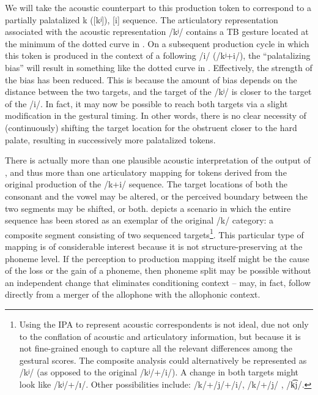 We will take the acoustic counterpart to this production token to
correspond to a partially palatalized k ({[kʲ]}), {[i]}
sequence. The articulatory representation associated with the acoustic
representation {/kʲ/} contains a TB gesture located at the
minimum of the dotted curve in . On a subsequent
production cycle in which this token is produced in the context of
a following {/i/} ({/kʲ+i/}), the “palatalizing
bias” will result in something like the dotted curve in .
Effectively, the strength of the bias has been reduced. This is because
the amount of bias depends on the distance between the two targets,
and the target of the {/kʲ/} is closer to the target of
the {/i/}. In fact, it may now be possible to reach both
targets via a slight modification in the gestural timing. In other
words, there is no clear necessity of (continuously) shifting the
target location for the obstruent closer to the hard palate, resulting
in successively more palatalized tokens. 

There is actually more than one plausible acoustic interpretation
of the output of , and thus more than one articulatory
mapping for tokens derived from the original production of the {/k+i/}
sequence. The target locations of both the consonant and the vowel
may be altered, or the perceived boundary between the two segments
may be shifted, or both.  depicts a
scenario in which the entire sequence has been stored as an exemplar
of the original {/k/} category: a composite segment consisting
of two sequenced targets\footnote{Using the IPA to represent acoustic correspondents is not ideal, due
not only to the conflation of acoustic and articulatory information,
but because it is not fine-grained enough to capture all the relevant
differences among the gestural scores. The composite analysis could
alternatively be represented as {/kʲ/} (as opposed to the
original {/kʲ/+/i/}). A change in both targets might look
like {/kʲ/+/ɪ/}. Other possibilities include: {/k/+/j/+/i/},
{/k/+/j/} , {/k͡j/}.}. This particular type of mapping is of considerable interest because
it is not structure-preserving at the phoneme level. If the perception
to production mapping itself might be the cause of the loss or the
gain of a phoneme, then phoneme split may be possible without an independent
change that eliminates conditioning context – may, in fact, follow
directly from a merger of the allophone with the allophonic context. 

